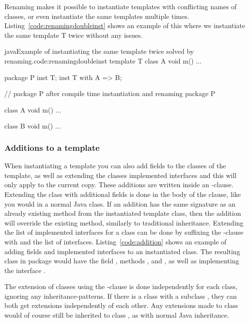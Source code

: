 Renaming makes it possible to instantiate templates with conflicting names of classes, or even instantiate the same templates multiple times.
Listing~\vref{code:renamingdoubleinst} shows an example of this where we instantiate the same template T twice without any issues.

\begin{code}{java}{Example of instantiating the same template twice solved by renaming.}{code:renamingdoubleinst}
template T {
    class A {
        void m() { ... }
    }
}

package P {
    inst T;
    inst T with A => B;
}

// package P after compile time instantiation and renaming
package P {
    class A {
        void m() { ... }
    }

    class B {
        void m() { ... }
    }
}
\end{code}

\subsubsection{Additions to a template}\label{subsubsec:additions}

When instantiating a template you can also add fields to the classes of the template, as well as extending the classes implemented interfaces and this will only apply to the current copy.
These additions are written inside an -clause.
Extending the class with additional fields is done in the body of the clause, like you would in a normal Java class.
If an addition has the same signature as an already existing method from the instantiated template class, then the addition will override the existing method, similarly to traditional inheritance.
Extending the list of implemented interfaces for a class can be done by suffixing the -clause with  and the list of interfaces.
Listing~\vref{code:addition} shows an example of adding fields and implemented interfaces to an instantiated class.
The resulting class  in package  would have the field , methods ,  and , as well as implementing the interface .

The extension of classes using the -clause is done independently for each class, ignoring any inheritance-patterns.
If there is a class  with a subclass , they can both get extensions independently of each other.
Any extensions made to class  would of course still be inherited to class , as with normal Java inheritance.


